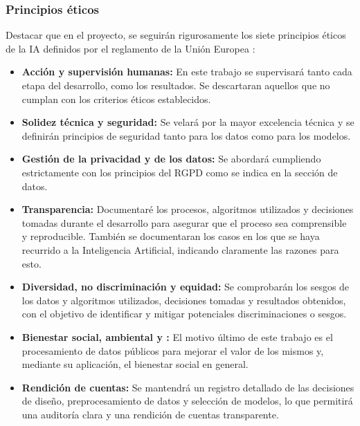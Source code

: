 \subsubsection{Principios éticos}  \label{sec:Metodos_Principios_EU}

Destacar que en el proyecto, se seguirán rigurosamente los siete principios éticos de la IA definidos por el reglamento de la Unión Europea \citep{webRIA2024Europa}:
 
 \begin{itemize} 
 	\item \textbf{Acción y supervisión humanas:} En este trabajo se supervisará tanto cada etapa del desarrollo, como los resultados. Se descartaran aquellos que no cumplan con los criterios éticos establecidos.
 	
 	\item \textbf{Solidez técnica y seguridad:} Se velará por la mayor excelencia técnica y se definirán principios de seguridad tanto para los datos como para los modelos.
 	
 	\item \textbf{Gestión de la privacidad y de los datos:} Se abordará cumpliendo estrictamente con los principios del RGPD como se indica en la sección de datos.
 	
 	\item \textbf{Transparencia:} Documentaré los procesos, algoritmos utilizados y decisiones tomadas durante el desarrollo para asegurar que el proceso sea comprensible y reproducible. También se documentaran los casos en los que se haya recurrido a la Inteligencia Artificial, indicando claramente las razones para esto.
 	
 	\item \textbf{Diversidad, no discriminación y equidad:} Se comprobarán los sesgos de los datos y algoritmos utilizados, decisiones tomadas y resultados obtenidos, con el objetivo de identificar y mitigar potenciales discriminaciones o sesgos.
 	
 	\item \textbf{Bienestar social, ambiental y :} El motivo último de este trabajo es el procesamiento de datos públicos para mejorar el valor de los mismos y, mediante su aplicación, el bienestar social en general.
 	
 	\item \textbf{Rendición de cuentas:} Se mantendrá un registro detallado de las decisiones de diseño, preprocesamiento de datos y selección de modelos, lo que permitirá una auditoría clara y una rendición de cuentas transparente.
 \end{itemize}


